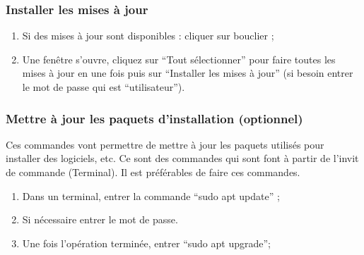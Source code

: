 \documentclass[12pt]{article}
\begin{document}
        \subsubsection{Installer les mises à jour}
            \begin{enumerate}
                \item Si des mises à jour sont disponibles : cliquer sur bouclier ;
                \item Une fenêtre s’ouvre, cliquez sur “Tout sélectionner” pour faire toutes les mises à jour en une fois puis sur “Installer les mises à jour” (si besoin entrer le mot de passe qui est “utilisateur”).
            \end{enumerate}
        \subsubsection{Mettre à jour les paquets d’installation (optionnel)}
        Ces commandes vont permettre de mettre à jour les paquets utilisés pour installer des logiciels, etc. Ce sont des commandes qui sont font à partir de l'invit de commande (Terminal). Il est préférables de faire ces commandes.
            \begin{enumerate}
                \item Dans un terminal, entrer la commande “sudo apt update” ;
                \item  Si nécessaire entrer le mot de passe.
                \item Une fois l’opération terminée, entrer “sudo apt upgrade”;
            \end{enumerate}
\end{document}

